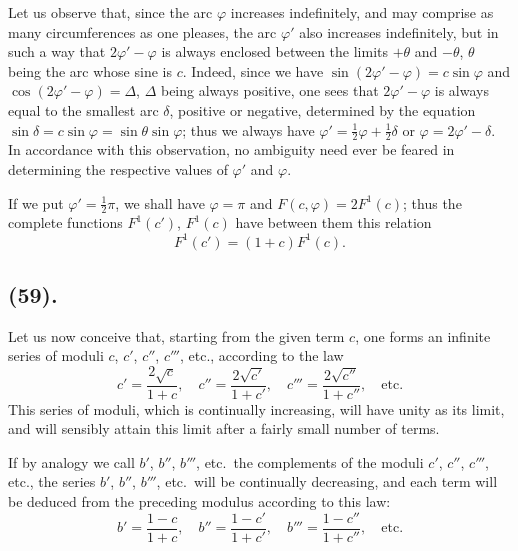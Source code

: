 \documentclass{article}
\begin{document}
Let us observe that, since the arc $\varphi$ increases indefinitely, and may comprise as many circumferences as one pleases, the arc $\varphi'$ also increases indefinitely, but in such a way that $2\varphi'-\varphi$ is always enclosed between the limits $+\theta$ and $-\theta$, $\theta$ being the arc whose sine is $c$. Indeed, since we have $\sin(2\varphi'-\varphi)=c\sin\varphi$ and $\cos(2\varphi'-\varphi)=\Delta$, $\Delta$ being always positive, one sees that $2\varphi'-\varphi$ is always equal to the smallest arc $\delta$, positive or negative, determined by the equation $\sin\delta=c\sin\varphi=\sin\theta\sin\varphi$; thus we always have $\varphi'=\frac{1}{2}\varphi+\frac{1}{2}\delta$ or $\varphi=2\varphi'-\delta$. In accordance with this observation, no ambiguity need ever be feared in determining the respective values of $\varphi'$ and $\varphi$.

If we put $\varphi'=\frac{1}{2}\pi$, we shall have $\varphi=\pi$ and $F(c,\varphi)=2F^{1}(c)$; thus the complete functions $F^{1}(c')$, $F^{1}(c)$ have between them this relation
\[ F^{1}(c')=(1+c)F^{1}(c). \]

\subsection*{(59).}

Let us now conceive that, starting from the given term $c$, one forms an infinite series of moduli $c$, $c'$, $c''$, $c'''$, etc., according to the law
\[ c'=\frac{2\sqrt{c}}{1+c},\quad c''=\frac{2\sqrt{c'}}{1+c'},\quad c'''=\frac{2\sqrt{c''}}{1+c''},\quad\text{etc.} \]
This series of moduli, which is continually increasing, will have unity as its limit, and will sensibly attain this limit after a fairly small number of terms.

If by analogy we call $b'$, $b''$, $b'''$, etc.\ the complements of the moduli $c'$, $c''$, $c'''$, etc., the series $b'$, $b''$, $b'''$, etc.\ will be continually decreasing, and each term will be deduced from the preceding modulus according to this law:
\[ b'=\frac{1-c}{1+c},\quad b''=\frac{1-c'}{1+c'},\quad b'''=\frac{1-c''}{1+c''},\quad\text{etc.} \]

\end{document}
